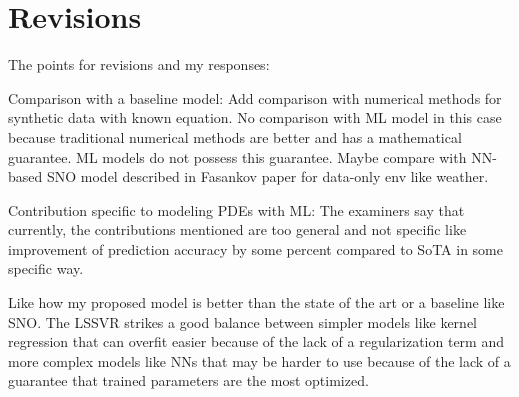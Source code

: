 \documentclass[a4paper,12pt]{scrreprt}
\begin{document}




\section*{Revisions}
The points for revisions and my responses:
\begin{numdesc}
    \item[Comparison with a baseline model:] Add comparison with numerical methods for synthetic data with known equation. No comparison with ML model in this case because traditional numerical methods are better and has a mathematical guarantee. ML models do not possess this guarantee. Maybe compare with NN-based SNO model described in Fasankov paper for data-only env like weather.
    \item[Contribution specific to modeling PDEs with ML:] The examiners say that currently, the contributions mentioned are too general and not specific like improvement of prediction accuracy by some percent compared to SoTA in some specific way.

    Like how my proposed model is better than the state of the art or a baseline like SNO\@. The LSSVR strikes a good balance between simpler models like kernel regression that can overfit easier because of the lack of a regularization term and more complex models like NNs that may be harder to use because of the lack of a guarantee that trained parameters are the most optimized.


\end{numdesc}
\end{document}
